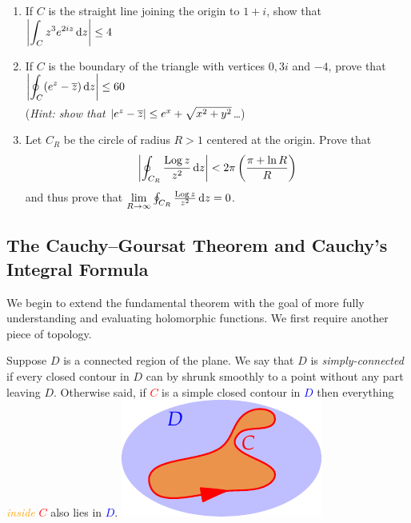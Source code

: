 \begin{exercises*}
\begin{enumerate}
  \item If $C$ is the straight line joining the origin to $1+i$, show that $\displaystyle\left| \int_C z^3e^{2iz}\,{\mathrm{d} z}\right|\le 4$

	\item If $C$ is the boundary of the triangle with vertices $0,3i$ and $-4$, prove that $\displaystyle\smash[b]{\left| \oint_C(e^z-\overline{z})\,{\mathrm{d} z}\right|}\le 60$\par
	(\emph{Hint: show that $\left| e^z-\overline{z}\right|\le e^x+\sqrt{x^2+y^2}$\ldots})
	
	\item Let $C_R$ be the circle of radius $R>1$ centered at the origin. Prove that 
	\[\left| \oint_{C_R}\frac{\operatorname{Log} z}{z^2}\,{\mathrm{d} z}\right| <2\pi\left(\frac{\pi +\ln R}R\right)\]
	and thus prove that $\lim\limits_{R\to\infty}\oint_{C_R}\frac{\operatorname{Log} z}{z^2}\,{\mathrm{d} z}=0$.
	
\end{enumerate}
\end{exercises*}
\clearpage


\subsection{The Cauchy--Goursat Theorem and Cauchy's Integral Formula}


We begin to extend the fundamental theorem with the goal of more fully understanding and evaluating holomorphic functions. We first require another piece of topology.

\begin{defn}[lower separated=false, sidebyside, sidebyside align=top seam, sidebyside gap=0pt, righthand width=0.35\linewidth]{}{}
Suppose $D$ is a connected region of the plane.\smallbreak
We say that $D$ is \emph{simply-connected} if every closed contour in $D$ can by shrunk smoothly to a point without any part leaving $D$.\smallbreak
Otherwise said, if \textcolor{red}{$C$} is a simple closed contour in \textcolor{blue}{$D$} then everything \textcolor{orange}{\emph{inside}} \textcolor{red}{$C$} also lies in \textcolor{blue}{$D$}.
\tcblower
\flushright\includegraphics{simplyconnected}
\end{defn}

